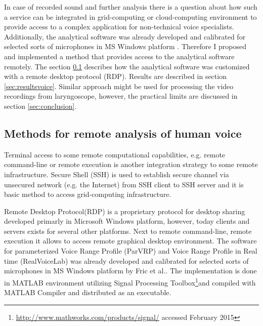 In case of recorded sound and further analysis there is a question about how such a service can be integrated in grid-computing or cloud-computing environment to provide access to a complex application for non-technical voice specialists. Additionally, the analytical software was already developed and calibrated for selected sorts of microphones in MS Windows platform \cite{Fric2007,Fric2012}. Therefore I proposed and implemented a method that provides access to the analytical software remotely. The section \ref{sec:methodsvoice} describes how the analytical software was customized with a remote desktop protocol (RDP). Results are described in section \ref{sec:resultsvoice}. Similar approach might be used for processing the video recordings from laryngoscope, however, the practical limits are discussed in section \ref{sec:conclusion}. 

\subsection{Methods for remote analysis of human voice}
\label{sec:methodsvoice}
Terminal access to some remote computational capabilities, e.g. remote command-line or remote execution is another integration strategy to some remote infrastructure. Secure Shell (SSH) is used to establish secure channel via unsecured network (e.g. the Internet) from SSH client to SSH server and it is basic method to access grid-computing infrastructure. 

Remote Desktop Protocol(RDP) is a proprietary protocol for desktop sharing developed primarly in Microsoft Windows platform, however, today clients and servers exists for several other platforms. Next to remote command-line, remote execution it allows to access remote graphical desktop environment. %
The software for parameterized Voice Range Profile (ParVRP) and Voice Range Profile in Real time (RealVoiceLab) was already developed and calibrated for selected sorts of microphones in MS Windows platform by Fric et al.\cite{Fric2007,Fric2012}. The implementation is done in MATLAB environment utilizing Signal Processing Toolbox\footnote{\url{http://www.mathworks.com/products/signal/} accessed February 2015}and compiled with MATLAB Compiler and distributed as an executable.

